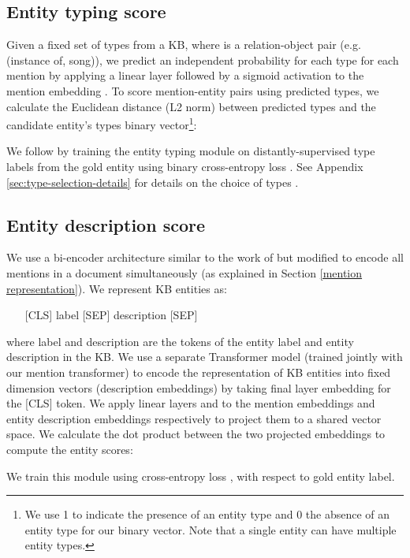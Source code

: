 \documentclass[11pt]{article}
\begin{document}
\subsection{Entity typing score }
Given a fixed set of types  from a KB, where  is a relation-object pair  (e.g. (instance of, song)), we predict an independent probability for each type  for each mention by applying a linear layer  followed by a sigmoid activation to the mention embedding . To score mention-entity pairs using predicted types, we calculate the Euclidean distance (L2 norm) between predicted types and the candidate entity's types  binary vector\footnote{We use 1 to indicate the presence of an entity type and 0 the absence of an entity type for our binary vector. Note that a single entity can have multiple entity types.}:

We follow \citet{DBLP:conf/aaai/OnoeD20} by training the entity typing module on distantly-supervised type labels from the gold entity using binary cross-entropy loss . See Appendix \ref{sec:type-selection-details} for details on the choice of types .

\subsection{Entity description score  } \label{descriptionscore}
We use a bi-encoder architecture similar to the work of \citet{wu-etal-2020-scalable} but modified to encode all mentions  in a document simultaneously (as explained in Section \ref{mention representation}). We represent KB entities as:
\vspace{-4mm}
\begin{itemize}
	\item[] [CLS] label [SEP] description [SEP]
\end{itemize}
\vspace{-2mm}
where label and description are the tokens of the entity label and entity description in the KB. We use a separate Transformer model (trained jointly with our mention transformer) to encode the representation of KB entities  into fixed dimension vectors (description embeddings)  by taking final layer embedding for the [CLS] token. We apply linear layers  and  to the mention embeddings  and entity description embeddings  respectively to project them to a shared vector space. We calculate the dot product between the two projected embeddings to compute the entity scores:

We train this module using cross-entropy loss , with respect to gold entity label.
\end{document}
